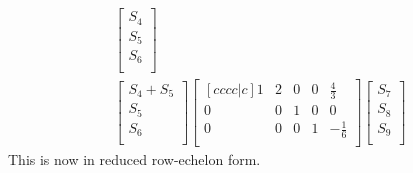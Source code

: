 \documentclass{report}
\begin{document}
\begin{align*}
\begin{bmatrix}
S_4\\ S_5\\ S_6\\
\end{bmatrix}\\
\begin{bmatrix}
S_4 + S_5\\
S_5\\
S_6\\
\end{bmatrix}
\begin{bmatrix}[cccc|c]
1 & 2 & 0 & 0 & \frac{4}{3}\\
0 & 0 & 1 & 0 & 0\\
0 & 0 & 0 & 1 & -\frac{1}{6}\\
\end{bmatrix}
\begin{bmatrix}
S_7\\
S_8\\
S_9\\
\end{bmatrix}
\end{align*}
This is now in reduced row-echelon form.\\
\\
\end{document}
